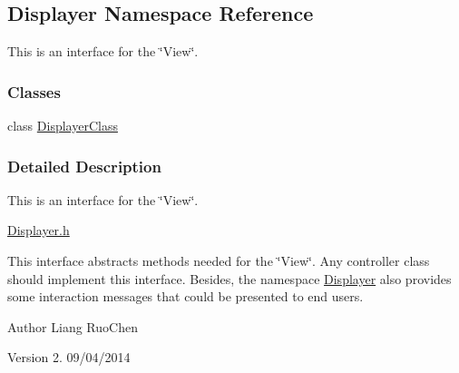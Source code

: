\hypertarget{namespace_displayer}{\subsection{Displayer Namespace Reference}
\label{namespace_displayer}
}


This is an interface for the \char`\"{}\+View\char`\"{}.  


\subsubsection*{Classes}
\begin{DoxyCompactItemize}
\item 
class \hyperlink{class_displayer_1_1_displayer_class}{Displayer\+Class}
\end{DoxyCompactItemize}


\subsubsection{Detailed Description}
This is an interface for the \char`\"{}\+View\char`\"{}. 

\hyperlink{_displayer_8h_source}{Displayer.\+h}

This interface abstracts methods needed for the \char`\"{}\+View\char`\"{}. Any controller class should implement this interface. Besides, the namespace \hyperlink{namespace_displayer}{Displayer} also provides some interaction messages that could be presented to end users.

\begin{DoxyAuthor}{Author}
Liang Ruo\+Chen 
\end{DoxyAuthor}
\begin{DoxyVersion}{Version}
2. 09/04/2014 
\end{DoxyVersion}
